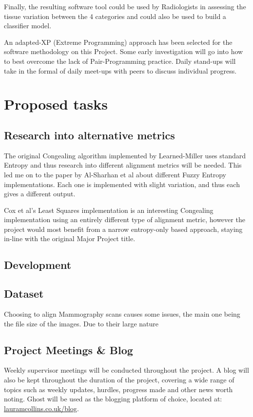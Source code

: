 \documentclass[11pt,fleqn,twoside]{article}
\begin{document}
Finally, the resulting software tool could be used by Radiologists in assessing the tissue variation between the 4 categories and could also be used to build a classifier model.

An adapted-XP (Extreme Programming) approach has been selected for the software methodology on this Project. Some early investigation will go into how to best overcome the lack of Pair-Programming practice. Daily stand-ups will take in the formal of daily meet-ups with peers to discuss individual progress.

\section{Proposed tasks}

\subsection{Research into alternative metrics}
\label{ssec:alt-met}
The original Congealing algorithm implemented by Learned-Miller uses standard Entropy and thus research into different alignment metrics will be needed. This led me on to the paper by Al-Sharhan et al \cite{fuzzy-entropy} about different Fuzzy Entropy implementations. Each one is implemented with slight variation, and thus each gives a different output.

Cox et al's Least Squares implementation \cite{least-squares-congealing} is an interesting Congealing implementation using an entirely different type of alignment metric, however the project would most benefit from a narrow entropy-only based approach, staying in-line with the original Major Project title.

\subsection{Development}

\subsection{Dataset}
Choosing to align Mammography scans causes some issues, the main one being the file size of the images. Due to their large nature

\subsection{Project Meetings \& Blog}
Weekly supervisor meetings will be conducted throughout the project. A blog will also be kept throughout the duration of the project, covering a wide range of topics such as weekly updates, hurdles, progress made and other news worth noting. Ghost will be used as the blogging platform of choice, located at: \url{lauramcollins.co.uk/blog}.
\end{document}
